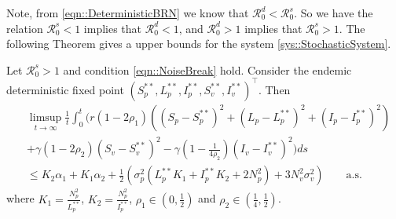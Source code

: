 Note, from \autoref{eqn::DeterministicBRN} we know that $\mathcal{R}^d_0<\mathcal{R}_0 ^ s $. 
So we have the relation $\mathcal{R}_0 ^s <1 $ implies that $\mathcal{R}_0 ^ d<1$, and 
$\mathcal{R}_0 ^d >1 $ implies that $\mathcal{R}_0 ^ s>1$. The following Theorem gives a upper
bounds for the system \autoref{sys::StochasticSystem}.
%
\begin{theorem}
	\label{thm::UpperBound}
	Let $\mathcal{R}^s_0>1$ and condition \autoref{eqn::NoiseBreak} hold. 
	Consider the endemic deterministic fixed point 
	$(S_p^{**},L_p^{**},I_p^{**},S_v^{**},I_v^{**})^\top$. Then 
	\begin{equation}\label{eqn::UP-1}
		\begin{aligned}
			&\limsup\limits_{t \rightarrow 	\infty}
			\frac{1}{t}
			\int_{0}^{t}( r
				\left(
					1 - 2 \rho_1
				\right)
				\left(
					(S_p - S_p^{**}) ^ 2 + 
					(L_p - L_p^{**}) ^ 2 + 
					(I_p - I_p^{**}) ^ 2
				\right)
			\\
			&+
				\gamma
				\left(
					1 - 2 \rho_2
				\right)
				(S_v - S_v^{**}) ^ 2 - 
				\gamma
				\left(
					1 - 
					\frac{1}{4 \rho_2}
				\right)
				(I_v - I_v^{**})^2)ds
			\\
			&\leq
				K_2
				\alpha_1 + K_1
				\alpha_2 + 
				\frac{1}{2}
				\left(
					\sigma_p ^ 2
					( L_p ^{**}K_1 + I_p ^{**} K_2 + 2N_p^2)
					+3 N_v^2 \sigma_v^2
				\right)
				\qquad\mbox{a.s.}
		\end{aligned}
	\end{equation}
%
	where 
	$
		K_1 = \frac{N_p^2}{L_p^{**}}
	$, 
	$
		K_2 = \frac{N_p^2}{I_p^{**}}
	$, 
	$
		\rho_1 \in (0, \frac{1}{2})
	$ and 
	$
		\rho_2\in (\frac{1}{4}, \frac{1}{2})
	$.
\end{theorem}
%
